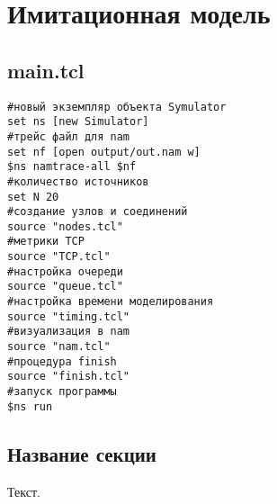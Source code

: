 
\chapter{Имитационная модель}
\label{app1}

\section{main.tcl}
\label{app1:sec1}
\begin{verbatim}
#новый экземпляр объекта Symulator
set ns [new Simulator]
#трейс файл для nam
set nf [open output/out.nam w]
$ns namtrace-all $nf
#количество источников 
set N 20
#создание узлов и соединений
source "nodes.tcl"
#метрики TCP
source "TCP.tcl"
#настройка очереди		
source "queue.tcl"
#настройка времени моделирования  		
source "timing.tcl" 		
#визуализация в nam
source "nam.tcl"   		
#процедура finish
source "finish.tcl"                                                                         
#запуск программы
$ns run
\end{verbatim}

\section{Название секции}
\label{app1:sec2}

Текст.

